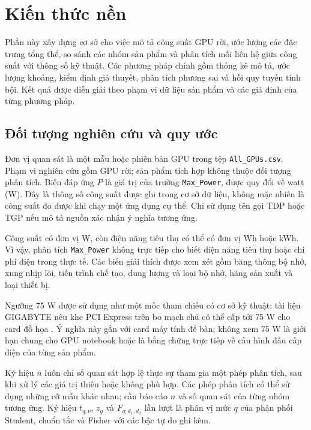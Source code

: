 \section{Kiến thức nền}

Phần này xây dựng cơ sở cho việc mô tả công suất GPU rời, ước lượng các đặc trưng tổng thể, so sánh các nhóm sản phẩm và phân tích mối liên hệ giữa công suất với thông số kỹ thuật. Các phương pháp chính gồm thống kê mô tả, ước lượng khoảng, kiểm định giả thuyết, phân tích phương sai và hồi quy tuyến tính bội. Kết quả được diễn giải theo phạm vi dữ liệu sản phẩm và các giả định của từng phương pháp.

\subsection{Đối tượng nghiên cứu và quy ước}

Đơn vị quan sát là một mẫu hoặc phiên bản GPU trong tệp \texttt{All\_GPUs.csv}. Phạm vi nghiên cứu gồm GPU rời; sản phẩm tích hợp không thuộc đối tượng phân tích. Biến đáp ứng \(P\) là giá trị của trường \texttt{Max\_Power}, được quy đổi về watt (W). Đây là thông số công suất được ghi trong cơ sở dữ liệu, không mặc nhiên là công suất đo được khi chạy một ứng dụng cụ thể. Chỉ sử dụng tên gọi TDP hoặc TGP nếu mô tả nguồn xác nhận ý nghĩa tương ứng.

Công suất có đơn vị W, còn điện năng tiêu thụ có thể có đơn vị Wh hoặc kWh. Vì vậy, phân tích \texttt{Max\_Power} không trực tiếp cho biết điện năng tiêu thụ hoặc chi phí điện trong thực tế. Các biến giải thích được xem xét gồm băng thông bộ nhớ, xung nhịp lõi, tiến trình chế tạo, dung lượng và loại bộ nhớ, hãng sản xuất và loại thiết bị.

Ngưỡng 75 W được sử dụng như một mốc tham chiếu có cơ sở kỹ thuật: tài liệu GIGABYTE nêu khe PCI Express trên bo mạch chủ có thể cấp tới 75 W cho card đồ họa \cite{ref1}. Ý nghĩa này gắn với card máy tính để bàn; không xem 75 W là giới hạn chung cho GPU notebook hoặc là bằng chứng trực tiếp về cấu hình đầu cấp điện của từng sản phẩm.

Ký hiệu \(n\) luôn chỉ số quan sát hợp lệ thực sự tham gia một phép phân tích, sau khi xử lý các giá trị thiếu hoặc không phù hợp. Các phép phân tích có thể sử dụng những cỡ mẫu khác nhau; cần báo cáo \(n\) và số quan sát của từng nhóm tương ứng. Ký hiệu \(t_{q,\nu}\), \(z_q\) và \(F_{q;d_1,d_2}\) lần lượt là phân vị mức \(q\) của phân phối Student, chuẩn tắc và Fisher với các bậc tự do ghi kèm.

